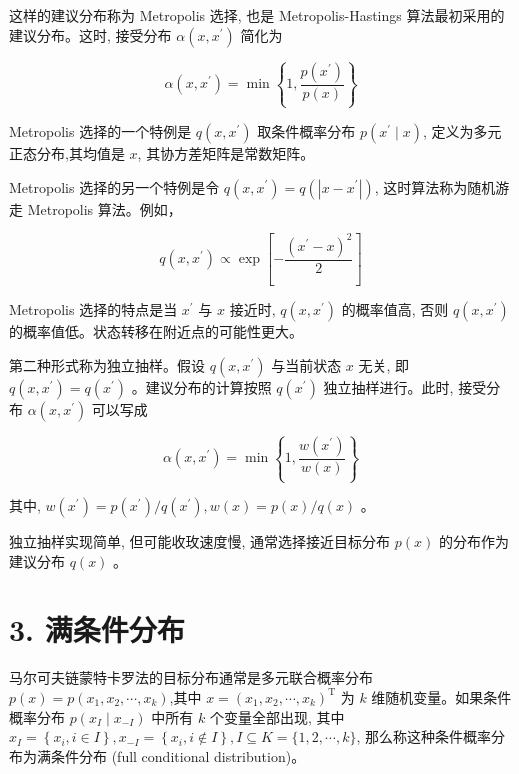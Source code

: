 \documentclass[10pt]{article}
\begin{document}
\begin{CJK*}{UTF8}{bsmi}
这样的建议分布称为 Metropolis 选择, 也是 Metropolis-Hastings 算法最初采用的建议分布。这时, 接受分布 $\alpha\left(x, x^{\prime}\right)$ 简化为


\begin{equation*}
\alpha\left(x, x^{\prime}\right)=\min \left\{1, \frac{p\left(x^{\prime}\right)}{p(x)}\right\} \tag{19.43}
\end{equation*}


Metropolis 选择的一个特例是 $q\left(x, x^{\prime}\right)$ 取条件概率分布 $p\left(x^{\prime} \mid x\right)$, 定义为多元正态分布,其均值是 $x$, 其协方差矩阵是常数矩阵。

Metropolis 选择的另一个特例是令 $q\left(x, x^{\prime}\right)=q\left(\left|x-x^{\prime}\right|\right)$, 这时算法称为随机游走 Metropolis 算法。例如，

$$
q\left(x, x^{\prime}\right) \propto \exp \left[-\frac{\left(x^{\prime}-x\right)^{2}}{2}\right]
$$

Metropolis 选择的特点是当 $x^{\prime}$ 与 $x$ 接近时, $q\left(x, x^{\prime}\right)$ 的概率值高, 否则 $q\left(x, x^{\prime}\right)$ 的概率值低。状态转移在附近点的可能性更大。

第二种形式称为独立抽样。假设 $q\left(x, x^{\prime}\right)$ 与当前状态 $x$ 无关, 即 $q\left(x, x^{\prime}\right)=q\left(x^{\prime}\right)$ 。建议分布的计算按照 $q\left(x^{\prime}\right)$ 独立抽样进行。此时, 接受分布 $\alpha\left(x, x^{\prime}\right)$ 可以写成


\begin{equation*}
\alpha\left(x, x^{\prime}\right)=\min \left\{1, \frac{w\left(x^{\prime}\right)}{w(x)}\right\} \tag{19.44}
\end{equation*}


其中, $w\left(x^{\prime}\right)=p\left(x^{\prime}\right) / q\left(x^{\prime}\right), w(x)=p(x) / q(x)$ 。

独立抽样实现简单, 但可能收玫速度慢, 通常选择接近目标分布 $p(x)$ 的分布作为建议分布 $q(x)$ 。

\section*{3. 满条件分布}
马尔可夫链蒙特卡罗法的目标分布通常是多元联合概率分布 $p(x)=p\left(x_{1}, x_{2}, \cdots, x_{k}\right)$,其中 $x=\left(x_{1}, x_{2}, \cdots, x_{k}\right)^{\mathrm{T}}$ 为 $k$ 维随机变量。如果条件概率分布 $p\left(x_{I} \mid x_{-I}\right)$ 中所有 $k$ 个变量全部出现, 其中 $x_{I}=\left\{x_{i}, i \in I\right\}, x_{-I}=\left\{x_{i}, i \notin I\right\}, I \subseteq K=\{1,2, \cdots, k\}$, 那么称这种条件概率分布为满条件分布 (full conditional distribution)。


\end{CJK*}
\end{document}
